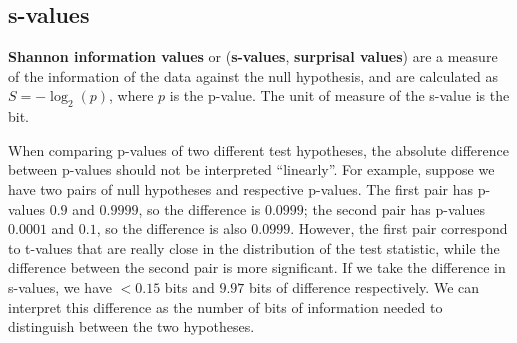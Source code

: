\subsection{s-values}

\textbf{Shannon information values} or (\textbf{s-values}, \textbf{surprisal values}) are a measure of the information of the data against the null hypothesis, and are calculated as $S = -\log_2(p)$, where $p$ is the p-value. The unit of measure of the s-value is the bit.

When comparing p-values of two different test hypotheses, the absolute difference between p-values should not be interpreted ``linearly''. For example, suppose we have two pairs of null hypotheses and respective p-values. The first pair has p-values $0.9$ and $0.9999$, so the difference is $0.0999$; the second pair has p-values $0.0001$ and $0.1$, so the difference is also $0.0999$. However, the first pair correspond to t-values that are really close in the distribution of the test statistic, while the difference between the second pair is more significant. If we take the difference in s-values, we have $< 0.15$ bits and $9.97$ bits of difference respectively. We can interpret this difference as the number of bits of information needed to distinguish between the two hypotheses.